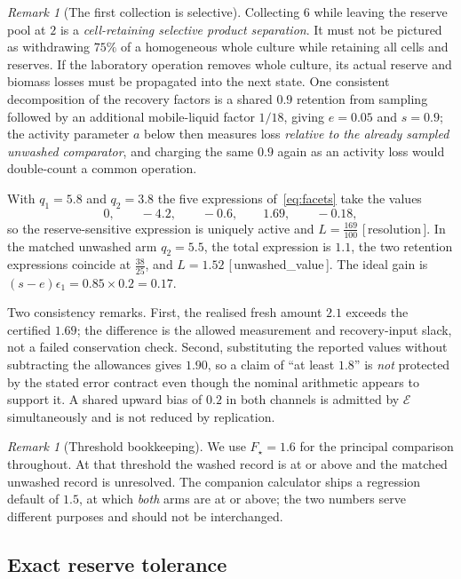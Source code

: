 \documentclass[11pt]{article}
\theoremstyle{plain}
\theoremstyle{definition}
\theoremstyle{remark}
\newtheorem{remark}[theorem]{Remark}
\newcommand{\leanref}[1]{{\normalfont\sffamily\footnotesize[\,#1\,]}}
\newcommand{\Lc}{L}
\begin{document}
\begin{remark}[The first collection is selective]\label{rem:selective}
Collecting $6$ while leaving the reserve pool at $2$ is a \emph{cell-retaining
selective product separation}. It must not be pictured as withdrawing $75\%$ of
a homogeneous whole culture while retaining all cells and reserves. If the
laboratory operation removes whole culture, its actual reserve and biomass
losses must be propagated into the next state. One consistent decomposition of
the recovery factors is a shared $0.9$ retention from sampling followed by an
additional mobile-liquid factor $1/18$, giving $e=0.05$ and $s=0.9$; the
activity parameter $a$ below then measures loss \emph{relative to the already
sampled unwashed comparator}, and charging the same $0.9$ again as an activity
loss would double-count a common operation.
\end{remark}

With $q_1=5.8$ and $q_2=3.8$ the five expressions of~\eqref{eq:facets} take
the values
\[
 0,\qquad -4.2,\qquad -0.6,\qquad \mathbf{1.69},\qquad -0.18 ,
\]
so the reserve-sensitive expression is uniquely active and
$\Lc=\tfrac{169}{100}$ \leanref{resolution}. In the matched unwashed arm
$q_2=5.5$, the total expression is $1.1$, the two retention expressions
coincide at $\tfrac{38}{25}$, and $\Lc=1.52$ \leanref{unwashed\_value}. The
ideal gain is $(s-e)\epsilon_1=0.85\times0.2=0.17$.

Two consistency remarks. First, the realised fresh amount $2.1$ exceeds the
certified $1.69$; the difference is the allowed measurement and recovery-input
slack, not a failed conservation check. Second, substituting the reported
values without subtracting the allowances gives $1.90$, so a claim of ``at
least $1.8$'' is \emph{not} protected by the stated error contract even though
the nominal arithmetic appears to support it. A shared upward bias of $0.2$ in
both channels is admitted by $\mathcal E$ simultaneously and is not reduced by
replication.

\begin{remark}[Threshold bookkeeping]
We use $F_\star=1.6$ for the principal comparison throughout. At that
threshold the washed record is at or above and the matched unwashed record is
unresolved. The companion calculator ships a regression default of $1.5$, at
which \emph{both} arms are at or above; the two numbers serve different
purposes and should not be interchanged.
\end{remark}

\subsection{Exact reserve tolerance}
\end{document}
